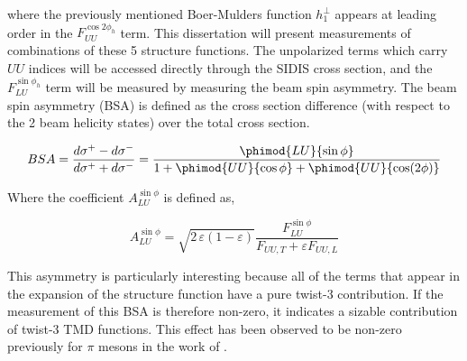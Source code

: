 where the previously mentioned Boer-Mulders function $h_{1}^{\perp}$ appears at leading order in the $F_{UU}^{\cos 2\phi_h}$ term.  This dissertation will present measurements of combinations of these 5 structure functions.  The unpolarized terms which carry $UU$ indices will be accessed directly through the SIDIS cross section, and the $F_{LU}^{\sin\phi_h}$ term will be measured by measuring the beam spin asymmetry.  The beam spin asymmetry (BSA) is defined as the cross section difference (with respect to the 2 beam helicity states) over the total cross section.

\begin{equation}
  BSA = \frac{d\sigma^+ - d\sigma^-}{d\sigma^+ + d\sigma^-} = \frac{\phimod{LU}{\sin\phi}}{1 + \phimod{UU}{\cos\phi} + \phimod{UU}{\cos(2\phi)}}
\end{equation}

Where the coefficient $A_{LU}^{\sin\phi}$ is defined as, 

\begin{equation}
  A_{LU}^{\sin\phi} = \sqrt{2\,\varepsilon (1-\varepsilon)} \frac{F_{LU}^{\sin\phi}}{F_{UU,T} + \varepsilon F_{UU,L}}
\end{equation}

This asymmetry is particularly interesting because all of the terms that appear in the expansion of the structure function have a pure twist-3 contribution.  If the measurement of this BSA is therefore non-zero, it indicates a sizable contribution of twist-3 TMD functions.  This effect has been observed to be non-zero previously for $\pi$ mesons in the work of \cite{pion-bsa-gohn}.  

